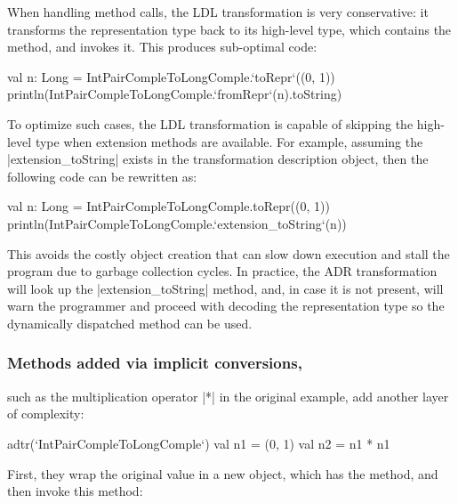 When handling method calls, the LDL transformation is very conservative: it transforms the representation type back to its high-level type, which contains the method, and invokes it. This produces sub-optimal code:

\begin{lstlisting-nobreak}
val n: Long = IntPairCompleToLongComple.`toRepr`((0, 1))
println(IntPairCompleToLongComple.`fromRepr`(n).toString)
\end{lstlisting-nobreak}

To optimize such cases, the LDL transformation is capable of skipping the high-level type when extension methods are available. For example, assuming the |extension_toString| exists in the transformation description object, then the following code can be rewritten as:

\begin{lstlisting-nobreak}
val n: Long = IntPairCompleToLongComple.toRepr((0, 1))
println(IntPairCompleToLongComple.`extension_toString`(n))
\end{lstlisting-nobreak}

This avoids the costly object creation that can slow down execution and stall the program due to garbage collection cycles. In practice, the ADR transformation will look up the |extension_toString| method, and, in case it is not present, will warn the programmer and proceed with decoding the representation type so the dynamically dispatched method can be used.

\subsubsection{Methods added via implicit conversions,} such as the multiplication operator |*| in the original example, add another layer of complexity:

\begin{lstlisting-nobreak}
adtr(`IntPairCompleToLongComple`) {
  val n1 = (0, 1)
  val n2 = n1 * n1
}
\end{lstlisting-nobreak}

First, they wrap the original value in a new object, which has the method, and then invoke this method:

